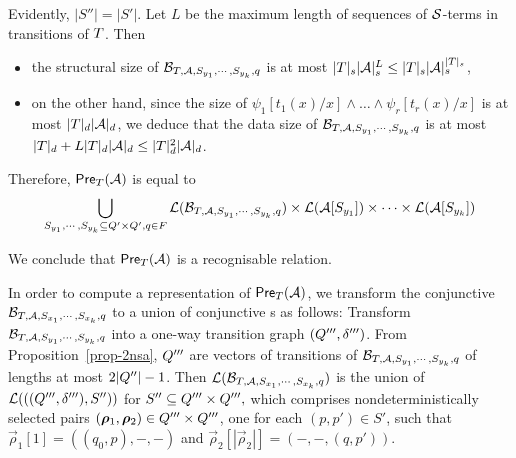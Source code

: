 Evidently, $|S''| = |S'|$.  Let $L$ be the maximum length of sequences of $\mathcal{S}$-terms in transitions of $T$. Then 
\begin{itemize}
\item the structural size of $\mathcal{B}_{T, \mathcal{A}, S_{y_1}, \cdots, S_{y_k}, q}$ is at most $|T|_s |\mathcal{A}|_s^{L} \le |T|_s |\mathcal{A}|_s^{|T|_s}$,
\item  on the other hand, since the size of $\psi_1[t_1(x)/x] \wedge \ldots \wedge \psi_r[t_r(x)/x]$ is at most $|T|_d |\mathcal{A}|_d$, we deduce that the data size of $\mathcal{B}_{T, \mathcal{A}, S_{y_1}, \cdots, S_{y_k}, q}$ is at most $|T|_d + L |T|_d |\mathcal{A}|_d \le |T|^2_d |\mathcal{A}|_d$.
\end{itemize}


Therefore, $\textsf{Pre}_{T}(\mathcal{A})$ is equal to 
\[
\bigcup_{S_{y_1}, \cdots, S_{y_k} \subseteq Q' \times Q', q\in F} \mathcal{L}(\mathcal{B}_{T, \mathcal{A}, S_{y_1}, \cdots, S_{y_k},q}) \times \mathcal{L}(\mathcal{A}[S_{y_1}]) \times \cdots  \times \mathcal{L}(\mathcal{A}[S_{y_k}])\]

We conclude that $\textsf{Pre}_{T}(\mathcal{A})$ is a recognisable relation. 

In order to compute a representation of $\textsf{Pre}_{T}(\mathcal{A})$, we transform the conjunctive \SSA{} $\mathcal{B}_{T, \mathcal{A}, S_{x_1}, \cdots, S_{x_k},q}$ to a union of conjunctive \SA{}s as follows: Transform $\mathcal{B}_{T, \mathcal{A}, S_{y_1}, \cdots, S_{y_k}, q}$ into a one-way transition graph $(Q''',\delta''')$. From Proposition~\ref{prop-2nsa}, $Q'''$ are vectors of transitions of $\mathcal{B}_{T, \mathcal{A}, S_{y_1}, \cdots, S_{y_k}, q}$ of lengths at most $2|Q''|-1$. Then $\mathcal{L}(\mathcal{B}_{T, \mathcal{A}, S_{x_1}, \cdots, S_{x_k},q})$ is the union of $\mathcal{L}(((Q''',\delta'''), S''))$ for $S'' \subseteq Q''' \times Q''',$ which comprises nondeterministically selected pairs $(\vec{\rho}_1, \vec{\rho}_2) \in \controls''' \times \controls'''$, one for each $(p, p') \in S'$, such that $\vec{\rho}_1[1] = ((q_0, p), -, -)$ and  $\vec{\rho}_2[|\vec{\rho}_2|] = (-, -, (q, p'))$.

